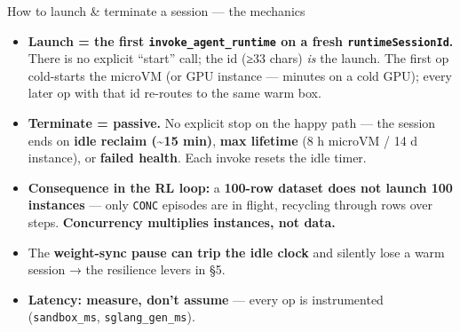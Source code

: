 \documentclass[
  10pt,
  ignorenonframetext,
  aspectratio=169,
  t]{beamer}
\providecommand{\tightlist}{%
  \setlength{\itemsep}{0pt}\setlength{\parskip}{0pt}}
\begin{document}
\begin{frame}{How to launch \& terminate a session --- the
mechanics}
\protect\hypertarget{how-to-launch-terminate-a-session-the-mechanics}{}
\begin{itemize}
\tightlist
\item
  \textbf{Launch = the first \texttt{invoke\_agent\_runtime} on a fresh
  \texttt{runtimeSessionId}.} There is no explicit ``start'' call; the
  id (≥33 chars) \emph{is} the launch. The first op cold-starts the
  microVM (or GPU instance --- minutes on a cold GPU); every later op
  with that id re-routes to the same warm box.
\item
  \textbf{Terminate = passive.} No explicit stop on the happy path ---
  the session ends on \textbf{idle reclaim (\textasciitilde15 min)},
  \textbf{max lifetime} (8 h microVM / 14 d instance), or \textbf{failed
  health}. Each invoke resets the idle timer.
\item
  \textbf{Consequence in the RL loop:} a \textbf{100-row dataset does
  not launch 100 instances} --- only \texttt{CONC} episodes are in
  flight, recycling through rows over steps. \textbf{Concurrency
  multiplies instances, not data.}
\item
  The \textbf{weight-sync pause can trip the idle clock} and silently
  lose a warm session → the resilience levers in §5.
\item
  \textbf{Latency: measure, don't assume} --- every op is instrumented
  (\texttt{sandbox\_ms}, \texttt{sglang\_gen\_ms}).
\end{itemize}
\end{frame}
\end{document}
